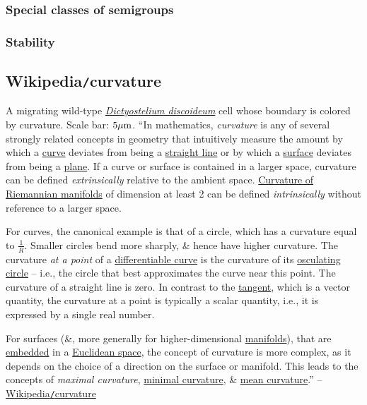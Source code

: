 \documentclass{article}
\begin{document}
\subsubsection{Special classes of semigroups}

\subsubsection{Stability}


\subsection{Wikipedia{\tt/}curvature}
{\sf A migrating wild-type \href{https://en.wikipedia.org/wiki/Dictyostelium_discoideum}{\it Dictyostelium discoideum} cell whose boundary is colored by curvature. Scale bar: $5\mu{\rm m}$.} ``In mathematics, {\it curvature} is any of several strongly related concepts in geometry that intuitively measure the amount by which a \href{https://en.wikipedia.org/wiki/Curve}{curve} deviates from being a \href{https://en.wikipedia.org/wiki/Straight_line}{straight line} or by which a \href{https://en.wikipedia.org/wiki/Surface_(mathematics)}{surface} deviates from being a \href{https://en.wikipedia.org/wiki/Plane_(geometry)}{plane}. If a curve or surface is contained in a larger space, curvature can be defined {\it extrinsically} relative to the ambient space. \href{https://en.wikipedia.org/wiki/Curvature_of_Riemannian_manifolds}{Curvature of Riemannian manifolds} of dimension at least 2 can be defined {\it intrinsically} without reference to a larger space.

For curves, the canonical example is that of a circle, which has a curvature equal to $\frac{1}{R}$. Smaller circles bend more sharply, \& hence have higher curvature. The curvature {\it at a point} of a \href{https://en.wikipedia.org/wiki/Differentiable_curve}{differentiable curve} is the curvature of its \href{https://en.wikipedia.org/wiki/Osculating_circle}{osculating circle} -- i.e., the circle that best approximates the curve near this point. The curvature of a straight line is zero. In contrast to the \href{https://en.wikipedia.org/wiki/Tangent}{tangent}, which is a vector quantity, the curvature at a point is typically a scalar quantity, i.e., it is expressed by a single real number.

For surfaces (\&, more generally for higher-dimensional \href{https://en.wikipedia.org/wiki/Manifold}{manifolds}), that are \href{https://en.wikipedia.org/wiki/Embedding}{embedded} in a \href{https://en.wikipedia.org/wiki/Euclidean_space}{Euclidean space}, the concept of curvature is more complex, as it depends on the choice of a direction on the surface or manifold. This leads to the concepts of {\it maximal curvature}, \href{https://en.wikipedia.org/wiki/Minimal_surface}{minimal curvature}, \& \href{https://en.wikipedia.org/wiki/Mean_curvature}{mean curvature}.'' -- \href{https://en.wikipedia.org/wiki/Curvature}{Wikipedia{\tt/}curvature}
\end{document}
